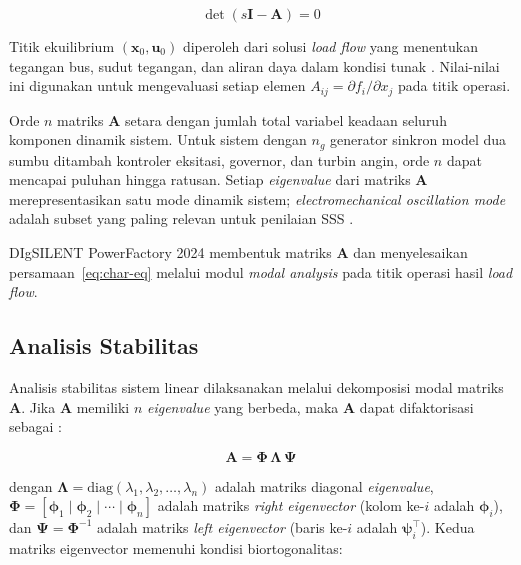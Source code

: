 \begin{equation}
  \det(s\mathbf{I} - \mathbf{A}) = 0
  \label{eq:char-eq}
\end{equation}

Titik ekuilibrium $(\mathbf{x}_0, \mathbf{u}_0)$ diperoleh dari solusi \textit{load
flow} yang menentukan tegangan bus, sudut tegangan, dan aliran daya dalam kondisi
tunak \cite{sauer2006power}. Nilai-nilai ini digunakan untuk mengevaluasi setiap elemen
$A_{ij} = \partial f_i / \partial x_j$ pada titik operasi.

Orde $n$ matriks $\mathbf{A}$ setara dengan jumlah total variabel keadaan seluruh
komponen dinamik sistem. Untuk sistem dengan $n_g$ generator sinkron model dua sumbu
ditambah kontroler eksitasi, governor, dan turbin angin, orde $n$ dapat mencapai
puluhan hingga ratusan. Setiap \textit{eigenvalue} dari matriks $\mathbf{A}$
merepresentasikan satu mode dinamik sistem; \textit{electromechanical oscillation mode}
adalah subset yang paling relevan untuk penilaian SSS \cite{kundur1994power}.

DIgSILENT PowerFactory 2024 membentuk matriks $\mathbf{A}$ dan menyelesaikan
persamaan~\eqref{eq:char-eq} melalui modul \textit{modal analysis}
pada titik operasi hasil \textit{load flow}.

\subsection{Analisis Stabilitas}

Analisis stabilitas sistem linear dilaksanakan melalui dekomposisi modal matriks
$\mathbf{A}$. Jika $\mathbf{A}$ memiliki $n$ \textit{eigenvalue} yang berbeda, maka
$\mathbf{A}$ dapat difaktorisasi sebagai \cite{kundur1994power}:

\begin{equation}
  \mathbf{A} = \boldsymbol{\Phi}\,\boldsymbol{\Lambda}\,\boldsymbol{\Psi}
  \label{eq:eigendecomp}
\end{equation}

dengan $\boldsymbol{\Lambda} = \mathrm{diag}(\lambda_1, \lambda_2, \ldots, \lambda_n)$
adalah matriks diagonal \textit{eigenvalue}, $\boldsymbol{\Phi} = [\boldsymbol{\phi}_1
\mid \boldsymbol{\phi}_2 \mid \cdots \mid \boldsymbol{\phi}_n]$ adalah matriks
\textit{right eigenvector} (kolom ke-$i$ adalah $\boldsymbol{\phi}_i$), dan
$\boldsymbol{\Psi} = \boldsymbol{\Phi}^{-1}$ adalah matriks \textit{left eigenvector}
(baris ke-$i$ adalah $\boldsymbol{\psi}_i^\top$). Kedua matriks eigenvector memenuhi
kondisi biortogonalitas:

